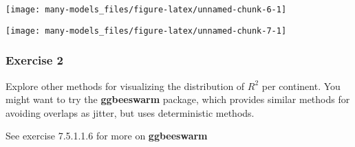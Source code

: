 \documentclass[]{book}
\newenvironment{Shaded}{\begin{snugshade}}{\end{snugshade}}
\newcommand{\DataTypeTok}[1]{\textcolor[rgb]{0.13,0.29,0.53}{#1}}
\newcommand{\FloatTok}[1]{\textcolor[rgb]{0.00,0.00,0.81}{#1}}
\newcommand{\KeywordTok}[1]{\textcolor[rgb]{0.13,0.29,0.53}{\textbf{#1}}}
\newcommand{\NormalTok}[1]{#1}
\newcommand{\OperatorTok}[1]{\textcolor[rgb]{0.81,0.36,0.00}{\textbf{#1}}}
\newcommand{\OtherTok}[1]{\textcolor[rgb]{0.56,0.35,0.01}{#1}}
\newcommand{\StringTok}[1]{\textcolor[rgb]{0.31,0.60,0.02}{#1}}
\theoremstyle{plain}
\theoremstyle{remark}
\theoremstyle{definition}
\theoremstyle{definition}
\theoremstyle{definition}
\theoremstyle{remark}
\begin{document}
\begin{center}\texttt{[image: many-models\_files/figure-latex/unnamed-chunk-6-1]} \end{center}

\begin{Shaded}
\end{Shaded}

\begin{center}\texttt{[image: many-models\_files/figure-latex/unnamed-chunk-7-1]} \end{center}

\hypertarget{exercise-2-65}{%
\subsubsection{Exercise 2}\label{exercise-2-65}}

Explore other methods for visualizing the distribution of \(R^2\) per
continent. You might want to try the \textbf{ggbeeswarm} package, which
provides similar methods for avoiding overlaps as jitter, but uses
deterministic methods.

See exercise 7.5.1.1.6 for more on \textbf{ggbeeswarm}

\begin{Shaded}
\end{Shaded}
\end{document}

